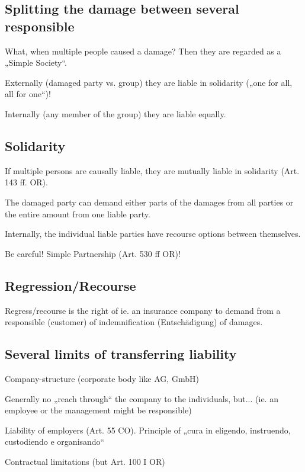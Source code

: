 \subsection{Splitting the damage between several responsible}
\begin{compactitem}
	\item What, when multiple people caused a damage? Then they are regarded as a „Simple Society“.
	\item Externally (damaged party vs. group) they are liable in solidarity („one for all, all for one“)!
	\item Internally (any member of the group) they are liable equally.
\end{compactitem}

\subsection{Solidarity}
\begin{compactitem}
	\item If multiple persons are causally liable, they are mutually liable in solidarity (Art.	143 ff. OR).
	\item The damaged party can demand either parts of the damages from all parties or the entire amount from one liable party.
	\item Internally, the individual liable parties have recourse options between themselves.
	\item Be careful! Simple Partnership (Art. 530 ff OR)!
\end{compactitem}

\subsection{Regression/Recourse}
Regress/recourse is the right of ie. an insurance company to demand from a responsible (customer) of indemnification (Entschädigung) of damages.

\subsection{Several limits of transferring liability}
\begin{compactitem}
	\item Company-structure (corporate body like AG, GmbH)
	\item Generally no „reach through“ the company to the individuals, but... (ie. an employee or the management might be responsible)
	\item Liability of employers (Art. 55 CO). Principle of „cura in eligendo, instruendo, custodiendo e organisando“
	\item Contractual limitations (but Art. 100 I OR)
\end{compactitem}

